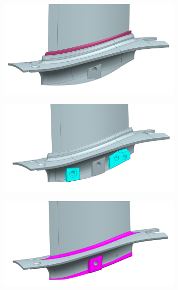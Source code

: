 \documentclass[preprints,article,accept,moreauthors,pdftex]{Definitions/mdpi}
\begin{document}
\begin{figure}[th!]
    \begin{center}
    \centering
        \begin{subfigure}[b]{0.3\textwidth}
            \centering
            \includegraphics[width=\textwidth]{figures/footGluedCad.png}
            \caption{}
            \label{fig:turbofan}
        \end{subfigure}
        \hfill
        \begin{subfigure}[b]{0.3\textwidth}
            \centering
            \includegraphics[width=\textwidth]{figures/footBoltedCad.png}
            \caption{}
            \label{fig:ogvRender}
        \end{subfigure}
        \hfill
        \begin{subfigure}[b]{0.3\textwidth}
            \centering
            \includegraphics[width=\textwidth]{figures/footOnePiceCad.png}

\end{subfigure}
\end{center}
\end{figure}
\end{document}
